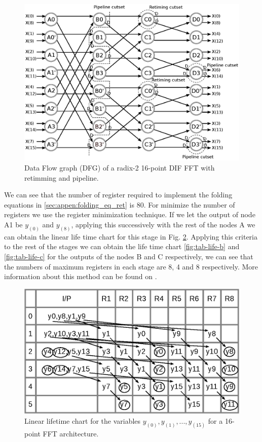 \documentclass[a4paper, 10pt, conference]{ieeeconf}
\begin{document}
\begin{figure}[ht!]
\centering
 \includegraphics[width=\linewidth]{Diagramas/Butter16_pipe.eps}%
\caption{Data Flow graph (DFG) of a radix-2 16-point DIF FFT with retimming and pipeline.}
\label{fig:dfg_16_ret}
\end{figure}

We can see that the number of register required to implement the folding equations in \ref{sec:appen:folding_eq_ret} is 80. For minimize the number of registers we use the register minimization technique. 
If we let the output of node A1 be $y_{(0)}$ and $y_{(8)}$, applying this successively with the rest of the nodes A we can obtain the linear life time chart for this stage in Fig. \ref{fig:tab-life-a}. Applying this criteria to the rest of the stages we can obtain the life time chart \ref{fig:tab-life-b} and \ref{fig:tab-life-c} for the outputs of the nodes B and C respectively, we can see that the numbers of maximum registers in each stage are 8, 4 and 8 respectively. More information about this method can be found on \cite{pipeline_parhi_book}.

\begin{figure}[ht!]
\centering
 \includegraphics[width=\linewidth]{Diagramas/tab_life_a.eps}%
\caption{Linear lifetime chart for the variables $y_{(0)}, y_{(1)},...,y_{(15)}$ for a 16-point FFT architecture.}
\label{fig:tab-life-a}
\end{figure}
\end{document}
